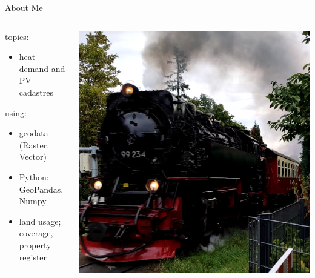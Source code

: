 

\begin{frame}{About Me}
	\begin{columns}
		
		\begin{column}{0.55\textwidth}
			\begin{tcolorbox}[enhanced jigsaw, colback=white, opacityback=.4,  colframe=ElixirPurple, arc=3mm, boxrule=0mm, height=0.8\textheight, valign=center, title=Working Life]
				
				\underline{topics}:
				\begin{itemize}
					\item heat demand and PV cadastres
				\end{itemize}
				\underline{using}:
				\begin{itemize}
					\item geodata (Raster, Vector)
					\item Python: GeoPandas, Numpy
					\item land usage; coverage, property register
				\end{itemize}
				
			\end{tcolorbox}
		\end{column}
		
		\begin{column}{0.55\textwidth}
			\begin{tcolorbox}[enhanced jigsaw, colback=white, opacityback=.4, colframe=ElixirPurple, arc=3mm, boxrule=0mm, height=0.8\textheight, valign=center, title=Privat Life]
				\includegraphics[height=\tcbtextheight,   keepaspectratio]{pictures/vlcsnap-2024-01-31-23h37m06s479.png}
			\end{tcolorbox}
		\end{column}
		
	\end{columns}
\end{frame}